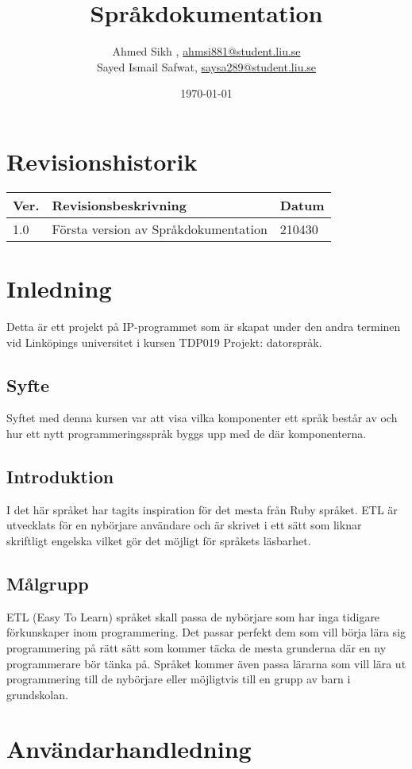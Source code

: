 \documentclass{TDP019mall}
\author{Ahmed Sikh , \url{ahmsi881@student.liu.se}\\
Sayed Ismail Safwat, \url{saysa289@student.liu.se}}
\title{Språkdokumentation}
\date{\today}
\begin{document}
\projectpage
\tableofcontents
\newpage
\section{Revisionshistorik}
\begin{table}[!h]
\begin{tabularx}{\linewidth}{|l|X|l|}
\hline
Ver. & Revisionsbeskrivning & Datum \\\hline
1.0 & Första version av Språkdokumentation & 210430 \\\hline
\end{tabularx}
\end{table}



\section{Inledning}
Detta är ett projekt på IP-programmet som är skapat under den andra terminen vid Linköpings universitet i kursen TDP019 Projekt: datorspråk.

\subsection{Syfte}
Syftet med denna kursen var att visa vilka komponenter ett språk består av och hur ett nytt programmeringsspråk byggs upp med de där komponenterna. 

\subsection{Introduktion}
I det här språket har tagits inspiration för det mesta från Ruby språket. ETL är utvecklats för en nybörjare användare och är skrivet i ett sätt som 
liknar skriftligt engelska vilket gör det möjligt för språkets läsbarhet.

\subsection{Målgrupp}
ETL (Easy To Learn) språket skall passa de nybörjare som har inga tidigare förkunskaper inom programmering. Det passar perfekt dem som vill börja lära 
sig programmering på rätt sätt som kommer täcka de mesta grunderna där en ny programmerare bör tänka på. Språket kommer även passa lärarna som vill lära
ut programmering till de nybörjare eller möjligtvis till en grupp av barn i grundskolan.


\section{Användarhandledning}
\end{document}

